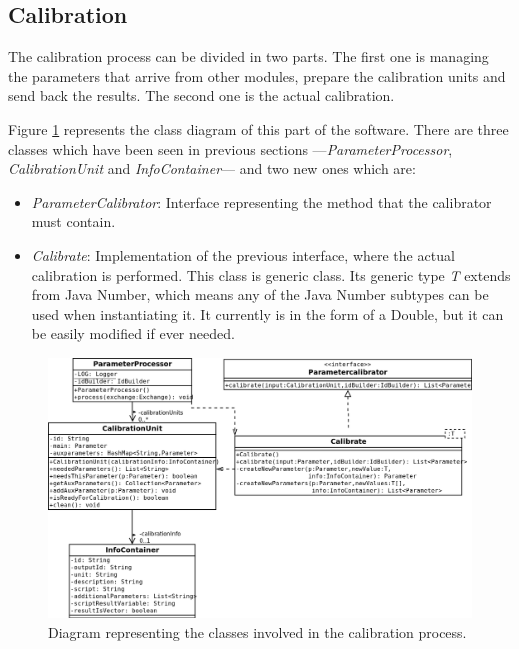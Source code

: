\subsection{Calibration}
The calibration process can be divided in two parts. The first one is managing the parameters that arrive from other modules, prepare the calibration units and send back the results. The second one is the actual calibration. 

Figure \ref{f5.4} represents the class diagram of this part of the software. There are three classes which have been seen in previous sections ---\emph{ParameterProcessor}, \emph{CalibrationUnit} and \emph{InfoContainer}--- and two new ones which are:
\begin{itemize}
\item \emph{ParameterCalibrator}: Interface representing the method that the calibrator must contain.
\item \emph{Calibrate}: Implementation of the previous interface, where the actual calibration is performed. This class is generic class. Its generic type \emph{T} extends from Java Number, which means any of the Java Number subtypes can be used when instantiating it. It currently is in the form of a Double, but it can be easily modified if ever needed.
\end{itemize}


\begin{figure}[H]
\centerline{\includegraphics[width=1\textwidth]{images/CalibrationClassDiagram.png}}
\caption{Diagram representing the classes involved in the calibration process.}
\label{f5.4}
\end{figure}

